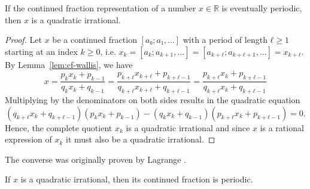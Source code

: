 \begin{theorem}
  If the continued fraction representation of a number $x ∈ ℝ$ is eventually periodic,
  then $x$ is a quadratic irrational.
\end{theorem}

\begin{proof}
  Let $x$ be a continued fraction $[a₀; a₁, …]$ with a period of length $ℓ ≥ 1$
  starting at an index $k ≥ 0$,
  i.e. $x_k = [a_k; a_{k+1}, …] = [a_{k+ℓ}; a_{k+ℓ+1}, …] = x_{k+ℓ}$.
  By Lemma~\ref{lem:cf-wallis}, we have
  \[
    x
    = \frac{p_k x_k + p_{k-1}}{q_k x_k + q_{k-1}}
    = \frac{p_{k+ℓ} x_{k+ℓ} + p_{k+ℓ-1}}{q_{k+ℓ} x_{k+ℓ} + q_{k+ℓ-1}}
    = \frac{p_{k+ℓ} x_k + p_{k+ℓ-1}}{q_{k+ℓ} x_k + q_{k+ℓ-1}}
  \]
  Multiplying by the denominators on both sides results in the quadratic equation
  \[
    (q_{k+ℓ} x_k + q_{k+ℓ-1})(p_k x_k + p_{k-1}) - (q_k x_k + q_{k-1}) (p_{k+ℓ} x_k + p_{k+ℓ-1}) = 0.
  \]
  Hence, the complete quotient $x_k$ is a quadratic irrational and
  since $x$ is a rational expression of $x_k$ it must also be a quadratic irrational.
\end{proof}

The converse was originally proven by Lagrange \cite{Lagrange70}.

\begin{theorem}
  If $x$ is a quadratic irrational,
  then its continued fraction is periodic.
\end{theorem}

